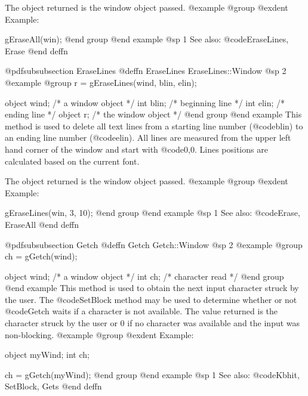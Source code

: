 The object returned is the window object passed.
@example
@group
@exdent Example:

gEraseAll(win);
@end group
@end example
@sp 1
See also:  @code{EraseLines, Erase}
@end deffn










@pdfsubsubsection {EraseLines}
@deffn {EraseLines} EraseLines::Window
@sp 2
@example
@group
r = gEraseLines(wind, blin, elin);

object  wind;   /*  a window object     */
int     blin;   /*  beginning line      */
int     elin;   /*  ending line         */
object  r;      /*  the window object   */
@end group
@end example
This method is used to delete all text lines from a starting line number
(@code{blin}) to an ending line number (@code{elin}). All lines are
measured from the upper left hand corner of the window and start with
@code{0,0}.  Lines positions are calculated based on the current font.

The object returned is the window object passed.
@example
@group
@exdent Example:

gEraseLines(win, 3, 10);
@end group
@end example
@sp 1
See also:  @code{Erase, EraseAll}
@end deffn









@pdfsubsubsection {Getch}
@deffn {Getch} Getch::Window
@sp 2
@example
@group
ch = gGetch(wind);

object  wind;   /*  a window object   */
int     ch;     /*  character read    */
@end group
@end example
This method is used to obtain the next input character struck by the
user.  The @code{SetBlock} method may be used to determine whether or not
@code{Getch} waits if a character is not available.  The value returned
is the character struck by the user or 0 if no character was available
and the input was non-blocking.
@example
@group
@exdent Example:

object  myWind;
int     ch;

ch = gGetch(myWind);
@end group
@end example
@sp 1
See also:  @code{Kbhit, SetBlock, Gets}
@end deffn
















